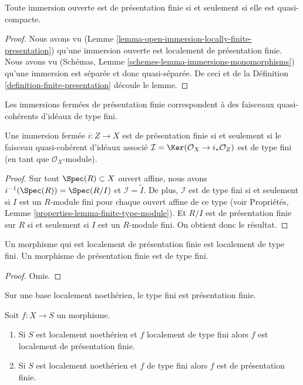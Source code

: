 \begin{lemma}
\label{lemma-quasi-compact-open-immersion-finite-presentation}
Toute immersion ouverte est de présentation finie si et seulement si elle
est quasi-compacte.
\end{lemma}

\begin{proof}
Nous avons vu (Lemme \ref{lemma-open-immersion-locally-finite-presentation}) qu'une immersion ouverte
est localement de présentation finie.
Nous avons vu (Schémas, Lemme \ref{schemes-lemma-immersions-monomorphisms}) qu'une immersion
est séparée et donc quasi-séparée. De ceci
et de la Définition \ref{definition-finite-presentation} découle le lemme.
\end{proof}

\begin{lemma}
\label{lemma-closed-immersion-finite-presentation}
\begin{slogan}
Les immersions fermées de présentation finie correspondent
à des faisceaux quasi-cohérents d'idéaux de type fini.
\end{slogan}
Une immersion fermée $i : Z \to X$ est de présentation finie si
et seulement si le faisceau quasi-cohérent
d'idéaux associé $\mathcal{I} = \Ker(\mathcal{O}_X \to i_*\mathcal{O}_Z)$ est de type
fini (en tant que $\mathcal{O}_X$-module).
\end{lemma}

\begin{proof}
Sur tout $\Spec(R) \subset X$ ouvert affine, nous avons
$i^{-1}(\Spec(R)) = \Spec(R/I)$ et $\mathcal{I} = \widetilde{I}$. De plus,
$\mathcal{I}$ est de type fini si et seulement si $I$
est un $R$-module fini pour chaque ouvert affine
de ce type (voir Propriétés,
Lemme \ref{properties-lemma-finite-type-module}). Et $R/I$ est de présentation finie
sur $R$ si et seulement si
$I$ est un $R$-module fini. On obtient donc le résultat.
\end{proof}

\begin{lemma}
\label{lemma-finite-presentation-finite-type}
Un morphisme qui est localement de présentation finie est localement de type fini.
Un morphisme de présentation finie est de type fini.
\end{lemma}

\begin{proof}
Omis.
\end{proof}

\begin{lemma}
\label{lemma-noetherian-finite-type-finite-presentation}
\begin{slogan}
Sur une base localement noethérien, le type fini est présentation finie.
\end{slogan}
Soit $f : X \to S$ un morphisme.
\begin{enumerate}
\item Si $S$ est localement noethérien et $f$ localement de type fini
alors $f$ est localement de présentation finie.
\item Si $S$ est localement noethérien et $f$ de type fini
alors $f$ est de présentation finie.
\end{enumerate}
\end{lemma}

